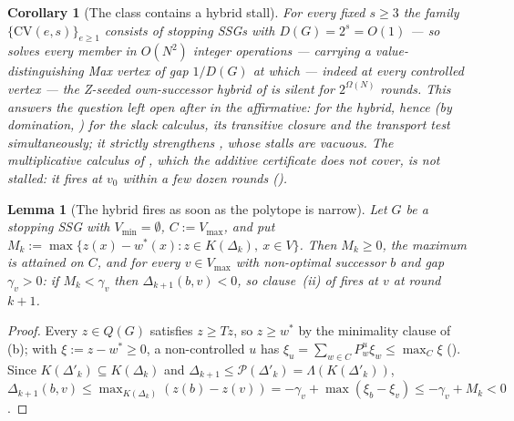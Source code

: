\documentclass[11pt]{article}
\theoremstyle{plain}
\newtheorem{lemma}[theorem]{Lemma}
\newtheorem{corollary}[theorem]{Corollary}
\theoremstyle{definition}
\newcommand{\Vmax}{V_{\max}}
\newcommand{\Vmin}{V_{\min}}
\begin{document}
\begin{corollary}[The class contains a hybrid stall]\label{cor:cv-class}
For every fixed $s\ge3$ the family $\{\mathrm{CV}(e,s)\}_{e\ge1}$ consists of
stopping SSGs with $D(G)=2^{s}=O(1)$ --- so  solves
every member in $O(N^{2})$ integer operations --- carrying a
value-distinguishing Max vertex of gap $1/D(G)$ at which --- indeed at
every controlled vertex --- the Z-seeded own-successor hybrid of
 is silent for $2^{\Omega(N)}$ rounds.
This answers the question left open after  in the
affirmative: for the hybrid, hence (by domination, )
for the slack calculus, its transitive closure and the transport test
simultaneously; it strictly strengthens
, whose stalls are vacuous. The multiplicative calculus
of , which the additive certificate does not cover, is
\emph{not} stalled: it fires at $v_0$ within a few dozen rounds
().
\end{corollary}

\begin{lemma}[The hybrid fires as soon as the polytope is narrow]\label{lem:hybrid-narrow}
Let $G$ be a stopping SSG with $\Vmin=\emptyset$, $C:=\Vmax$, and put
$M_k:=\max\{z(x)-w^\ast(x):z\in K(\Delta_k),\ x\in V\}$. Then $M_k\ge0$, the
maximum is attained on $C$, and for every $v\in\Vmax$ with non-optimal
successor $b$ and gap $\gamma_v>0$: if $M_k<\gamma_v$ then
$\Delta_{k+1}(b,v)<0$, so clause~(ii) of  fires at $v$
at round $k+1$.
\end{lemma}

\begin{proof}
Every $z\in Q(G)$ satisfies $z\ge Tz$, so $z\ge w^\ast$ by the minimality
clause of (b); with $\xi:=z-w^\ast\ge0$, a non-controlled
$u$ has $\xi_u=\sum_{w\in C}P^{u}_w\xi_w\le\max_C\xi$
(). Since $K(\Delta'_k)\subseteq K(\Delta_k)$ and
$\Delta_{k+1}\le\mathcal P(\Delta'_k)=\Lambda(K(\Delta'_k))$,
$\Delta_{k+1}(b,v)\le\max_{K(\Delta_k)}(z(b)-z(v))=-\gamma_v+\max(\xi_b-\xi_v)
\le-\gamma_v+M_k<0$.
\end{proof}
\end{document}

